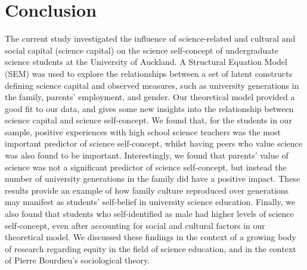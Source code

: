 \documentclass[smallextended]{svjour3}       %
\begin{document}
\section*{Conclusion}
The current study investigated the influence of science-related and cultural and social capital (science capital) on the science self-concept of undergraduate science students at the University of Auckland. A Structural Equation Model (SEM) was used to explore the relationships between a set of latent constructs defining science capital and observed measures, such as university generations in the family, parents' employment, and gender. Our theoretical model provided a good fit to our data, and gives some new insights into the relationship between science capital and science self-concept. We found that, for the students in our sample, positive experiences with high school science teachers was the most important predictor of science self-concept, whilst having peers who value science was also found to be important. Interestingly, we found that parents' value of science was not a significant predictor of science self-concept, but instead the number of university generations in the family did have a positive impact. These results provide an example of how family culture reproduced over generations may manifest as students' self-belief in university science education. Finally, we also found that students who self-identified as male had higher levels of science self-concept, even after accounting for social and cultural factors in our theoretical model. We discussed these findings in the context of a growing body of research regarding equity in the field of science education, and in the context of Pierre Bourdieu's sociological theory.  

\end{document}
